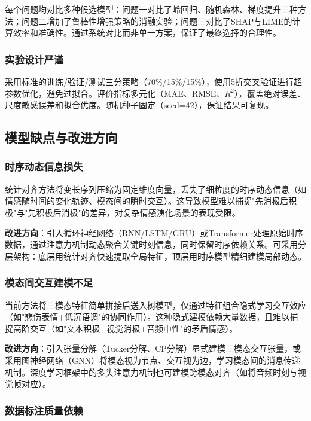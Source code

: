 每个问题均对比多种候选模型：问题一对比了岭回归、随机森林、梯度提升三种方法；问题二增加了鲁棒性增强策略的消融实验；问题三对比了SHAP与LIME的计算效率和准确性。通过系统对比而非单一方案，保证了最终选择的合理性。

\subsubsection{实验设计严谨}

采用标准的训练/验证/测试三分策略（70\%/15\%/15\%），使用5折交叉验证进行超参数优化，避免过拟合。评价指标多元化（MAE、RMSE、$R^2$），覆盖绝对误差、尺度敏感误差和拟合优度。随机种子固定（seed=42），保证结果可复现。

\subsection{模型缺点与改进方向}

\subsubsection{时序动态信息损失}

统计对齐方法将变长序列压缩为固定维度向量，丢失了细粒度的时序动态信息（如情感随时间的变化轨迹、模态间的瞬时交互）。这导致模型难以捕捉"先消极后积极"与"先积极后消极"的差异，对复杂情感演化场景的表现受限。

\textbf{改进方向}：引入循环神经网络（RNN/LSTM/GRU）或Transformer处理原始时序数据，通过注意力机制动态聚合关键时刻信息，同时保留时序依赖关系。可采用分层架构：底层用统计对齐快速提取全局特征，顶层用时序模型精细建模局部动态。

\subsubsection{模态间交互建模不足}

当前方法将三模态特征简单拼接后送入树模型，仅通过特征组合隐式学习交互效应（如"悲伤表情+低沉语调"的协同作用）。这种隐式建模依赖大量数据，且难以捕捉高阶交互（如"文本积极+视觉消极+音频中性"的矛盾情感）。

\textbf{改进方向}：引入张量分解（Tucker分解、CP分解）显式建模三模态交互张量，或采用图神经网络（GNN）将模态视为节点、交互视为边，学习模态间的消息传递机制。深度学习框架中的多头注意力机制也可建模跨模态对齐（如将音频时刻与视觉帧对应）。

\subsubsection{数据标注质量依赖}

